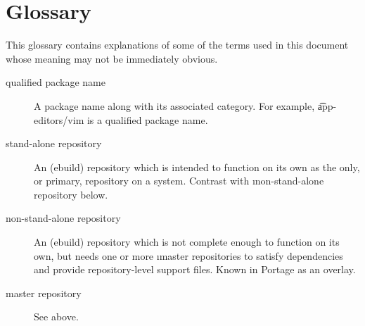 \chapter*{Glossary}

This glossary contains explanations of some of the terms used in this document whose meaning may not
be immediately obvious.

\begin{description}
\item[qualified package name] A package name along with its associated category. For example,
    \t{app-editors/vim} is a qualified package name.
\item[stand-alone repository] An (ebuild) repository which is intended to function on its own as the
    only, or primary, repository on a system. Contrast with \i{non-stand-alone repository} below.
\item[non-stand-alone repository] An (ebuild) repository which is not complete enough to function
    on its own, but needs one or more \i{master repositories} to satisfy dependencies and provide
    repository-level support files. Known in Portage as an overlay.
\item[master repository] See above.

\end{description}


